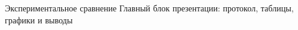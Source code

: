 \SPBGSectionSlide
  {Экспериментальное сравнение}
  {Главный блок презентации: протокол, таблицы, графики и выводы}
